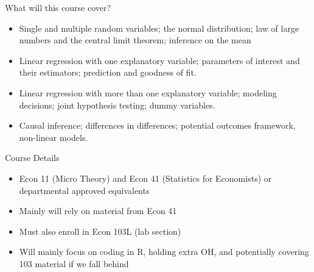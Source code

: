 \documentclass[notheorems,10pt]{beamer}
\begin{document}
\begin{frame}{What will this course cover?} 
	\begin{itemize}
		\item<1->  Single and multiple random variables; the normal distribution; law of large numbers and the central limit theorem; inference on the mean
		\item<2->  Linear regression with one explanatory variable; parameters of interest and their estimators; prediction and goodness of fit.
		\item<3->  Linear regression with more than one explanatory variable; modeling decisions; joint hypothesis testing; dummy variables.
		\item<4->  Causal inference; differences in differences; potential outcomes framework, non-linear models.
	\end{itemize}	
\end{frame}

\begin{frame}{Course Details} 
	\begin{itemize}
		\item Econ 11 (Micro Theory) and Econ 41 (Statistics for Economists) or departmental approved equivalents
		\item Mainly will rely on material from Econ 41
	\end{itemize}
	\begin{itemize}
		\item Must also enroll in Econ 103L (lab section)
		\item Will mainly focus on coding in R, holding extra OH, and potentially covering 103 material if we fall behind
	\end{itemize}
\end{frame}
\end{document}
